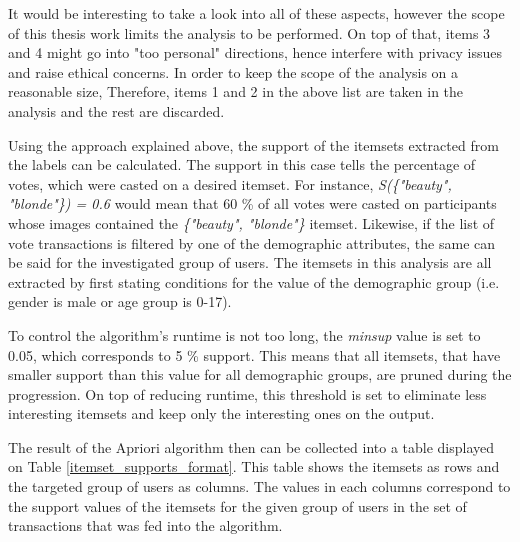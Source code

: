     It would be interesting to take a look into all of these aspects, however the scope of this thesis work limits the analysis to be performed. On top of that, items 3 and 4 might go into "too personal" directions, hence interfere with privacy issues and raise ethical concerns. In order to keep the scope of the analysis on a reasonable size, Therefore, items 1 and 2 in the above list are taken in the analysis and the rest are discarded. 
    
    Using the approach explained above, the support of the itemsets extracted from the labels can be calculated. The support in this case tells the percentage of votes, which were casted on a desired itemset. For instance, \emph{S(\{"beauty", "blonde"\}) = 0.6} would mean that 60 \% of all votes were casted on participants whose images contained the \emph{\{"beauty", "blonde"\}} itemset. Likewise, if the list of vote transactions is filtered by one of the demographic attributes, the same can be said for the investigated group of users. The itemsets in this analysis are all extracted by first stating conditions for the value of the demographic group (i.e. gender is male or age group is 0-17).

    To control the algorithm's runtime is not too long, the \emph{minsup} value is set to 0.05, which corresponds to 5 \% support. This means that all itemsets, that have smaller support than this value for all demographic groups, are pruned during the progression. On top of reducing runtime, this threshold is set to eliminate less interesting itemsets and keep only the interesting ones on the output.

    The result of the Apriori algorithm then can be collected into a table displayed on Table \ref{itemset_supports_format}. This table shows the itemsets as rows and the targeted group of users as columns. The values in each columns correspond to the support values of the itemsets for the given group of users in the set of transactions that was fed into the algorithm. 


